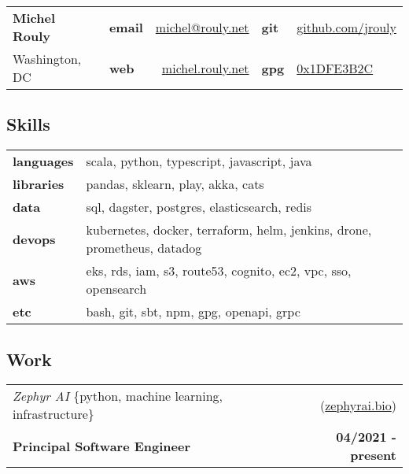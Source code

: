 \documentclass[10pt,letterpaper]{article}
\begin{document}
\setcounter{secnumdepth}{0}

\noindent
\begin{tabularx}{\textwidth}{@{} l X lr lX @{}}
  {\Large\textbf{Michel Rouly}} & &
      \textbf{email} & \href{mailto:michel@rouly.net}{michel@rouly.net} &
      \textbf{git} & \href{https://github.com/jrouly}{github.com/jrouly} \\
  {Washington, DC} & &
      \textbf{web} & \href{https://michel.rouly.net}{michel.rouly.net} &
      \textbf{gpg} & \href{https://keyserver.ubuntu.com/pks/lookup?search=0x1DFE3B2C\&fingerprint=on\&op=index}{0x1DFE3B2C} \\
\end{tabularx}

\subsection{Skills}

\noindent
\begin{tabularx}{\textwidth}{@{} lX @{}}
  \textbf{languages} & scala, python, typescript, javascript, java \\
  \textbf{libraries} & pandas, sklearn, play, akka, cats \\
  \textbf{data} & sql, dagster, postgres, elasticsearch, redis \\
  \textbf{devops} & kubernetes, docker, terraform, helm, jenkins, drone, prometheus, datadog \\
  \textbf{aws} & eks, rds, iam, s3, route53, cognito, ec2, vpc, sso, opensearch \\
  \textbf{etc} & bash, git, sbt, npm, gpg, openapi, grpc
\end{tabularx}

\subsection{Work}

\noindent\begin{tabularx}{\textwidth}{@{} Xr @{}}
  \textit{Zephyr AI} \{python, machine learning, infrastructure\} & (\href{https://zephyrai.bio}{zephyrai.bio}) \\
  \textbf{Principal Software Engineer} & \textbf{04/2021 - present} \\
\end{tabularx}
\end{document}
